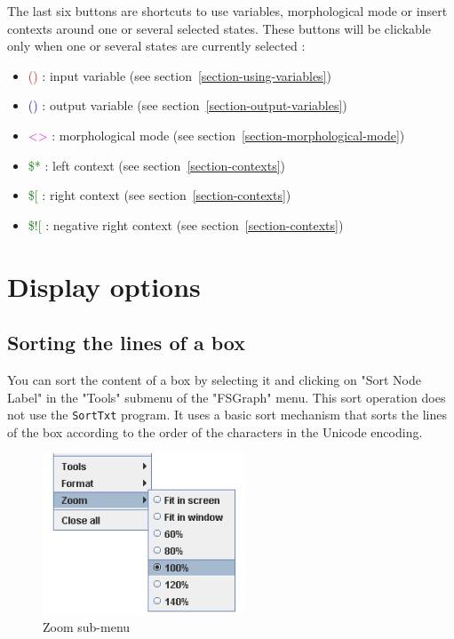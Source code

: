 The last six buttons are shortcuts to use variables, morphological mode or insert contexts around one or several selected states. These buttons will be clickable only when one or several states are currently selected :
\begin{itemize}
\item \textcolor{red}{()}  : input variable	(see section~\ref{section-using-variables})
\item \textcolor{blue}{()} : output variable (see section~\ref{section-output-variables})
\item \textcolor{magenta}{<>}  : morphological mode (see section~\ref{section-morphological-mode})
\item \textcolor{green}{\$*} : left context (see section~\ref{section-contexts})
\item \textcolor{green}{\$[} : right context (see section~\ref{section-contexts})
\item \textcolor{green}{\$![} : negative right context (see section~\ref{section-contexts})
\end{itemize}

\bigskip
\section{Display options}

\subsection{Sorting the lines of a box}
You can sort the content of a box by selecting it and clicking on "Sort Node
Label" in the "Tools" submenu of the "FSGraph" menu. This sort operation does
not use the \verb+SortTxt+ program. It uses a basic sort mechanism that sorts
the lines of the box according to the order of the characters in the Unicode
encoding.

\begin{figure}[!h]
\begin{center}
\includegraphics[width=6cm]{resources/img/fig5-21.png}
\caption{Zoom sub-menu}
\end{center}
\end{figure}
